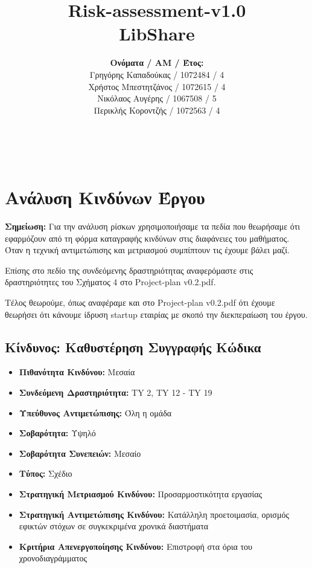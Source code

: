 \documentclass[12pt,a4paper]{article}
\title{Risk-assessment-v1.0\\ LibShare}
\author{\textbf{Ονόματα / ΑΜ / Έτος:} \\ Γρηγόρης Καπαδούκας / 1072484 / 4\textdegree \\ Χρήστος Μπεστητζάνος / 1072615 / 4\textdegree \\ Νικόλαος Αυγέρης / 1067508 / 5\textdegree \\ Περικλής Κοροντζής / 1072563 / 4\textdegree}
\begin{document}
\makeatletter
\begin{center}
	\LARGE{\@title} \\
	\pagebreak
    \begin{LARGE}\@author\end{LARGE}
    \pagebreak
\end{center}

\section{Ανάλυση Κινδύνων Έργου}

\textbf{Σημείωση:} Για την ανάλυση ρίσκων χρησιμοποιήσαμε τα πεδία που θεωρήσαμε ότι εφαρμόζουν από τη φόρμα καταγραφής κινδύνων στις διαφάνειες του μαθήματος. Όταν η τεχνική αντιμετώπισης και μετριασμού συμπίπτουν τις έχουμε βάλει μαζί.

Επίσης στο πεδίο της συνδεόμενης δραστηριότητας αναφερόμαστε στις δραστηριότητες του Σχήματος 4 στο Project-plan v0.2.pdf.

Τέλος θεωρούμε, όπως αναφέραμε και στο Project-plan v0.2.pdf ότι έχουμε θεωρήσει ότι κάνουμε ίδρυση startup εταιρίας με σκοπό την διεκπεραίωση του έργου.

\subsection{Κίνδυνος: Καθυστέρηση Συγγραφής Κώδικα}
\begin{itemize}
	\item \textbf{Πιθανότητα Κινδύνου:} Μεσαία
	\item \textbf{Συνδεόμενη Δραστηριότητα:} TY 2, TY 12 - TY 19
	\item \textbf{Υπεύθυνος Αντιμετώπισης:} Όλη η ομάδα
	\item \textbf{Σοβαρότητα:} Υψηλό
	\item \textbf{Σοβαρότητα Συνεπειών:} Μεσαίο
	\item \textbf{Τύπος:} Σχέδιο
	\item \textbf{Στρατηγική Μετριασμού Κινδύνου:} Προσαρμοστικότητα εργασίας
	\item \textbf{Στρατηγική Αντιμετώπισης Κινδύνου:} Κατάλληλη προετοιμασία, ορισμός εφικτών στόχων σε συγκεκριμένα χρονικά διαστήματα
	\item \textbf{Κριτήρια Απενεργοποίησης Κινδύνου:} Επιστροφή στα όρια του χρονοδιαγράμματος
\end{itemize}
\end{document}
